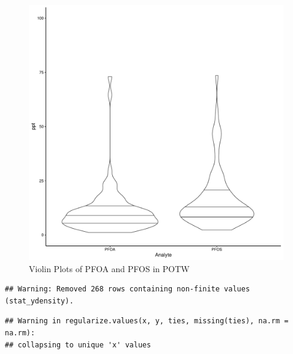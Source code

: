 \documentclass[
  12pt,
]{article}
\begin{document}
\begin{figure}

\includegraphics{PFAS_FinalProject_files/figure-latex/unnamed-chunk-8-1} \hfill{}

\caption{Violin Plots of PFOA and PFOS in POTW}\label{fig:unnamed-chunk-8}
\end{figure}

\begin{verbatim}
## Warning: Removed 268 rows containing non-finite values (stat_ydensity).
\end{verbatim}

\begin{verbatim}
## Warning in regularize.values(x, y, ties, missing(ties), na.rm = na.rm):
## collapsing to unique 'x' values
\end{verbatim}
\end{document}
